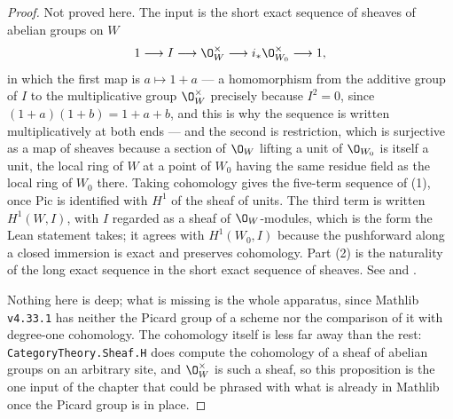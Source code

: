 \begin{proof}
Not proved here.  The input is the short exact sequence of sheaves of abelian
groups on $W$
\[
  1\longrightarrow I\longrightarrow\O_W^\times\longrightarrow
  i_*\O_{W_0}^\times\longrightarrow1 ,
\]
in which the first map is $a\mapsto1+a$ --- a homomorphism from the additive
group of $I$ to the multiplicative group $\O_W^\times$ precisely because
$I^2=0$, since $(1+a)(1+b)=1+a+b$, and this is why the sequence is written
multiplicatively at both ends --- and the second is restriction, which is
surjective as a map of sheaves because a section of $\O_W$ lifting a unit of
$\O_{W_0}$ is itself a unit, the local ring of $W$ at a point of $W_0$ having
the same residue field as the local ring of $W_0$ there.  Taking cohomology
gives the five-term sequence of
(1), once $\mathrm{Pic}$ is identified with $H^1$ of the sheaf of units.  The
third term is written $H^1(W,I)$, with $I$ regarded as a sheaf of
$\O_W$-modules, which is the form the Lean statement takes; it agrees with
$H^1(W_0,I)$ because the pushforward along a closed immersion is exact and
preserves cohomology.  Part
(2) is the naturality of the long exact sequence in the short exact sequence of
sheaves.  See  and \cite[III, Exercise 4.6]{Hartshorne}.

Nothing here is deep; what is missing is the whole apparatus, since Mathlib
\texttt{v4.33.1} has neither the Picard group of a scheme nor the comparison of
it with degree-one cohomology.  The cohomology itself is less far away than the
rest: \texttt{CategoryTheory.Sheaf.H} does compute the cohomology of a sheaf of
abelian groups on an arbitrary site, and $\O_W^\times$ is such a sheaf, so this
proposition is the one input of the chapter that could be phrased with what is
already in Mathlib once the Picard group is in place.
\end{proof}

